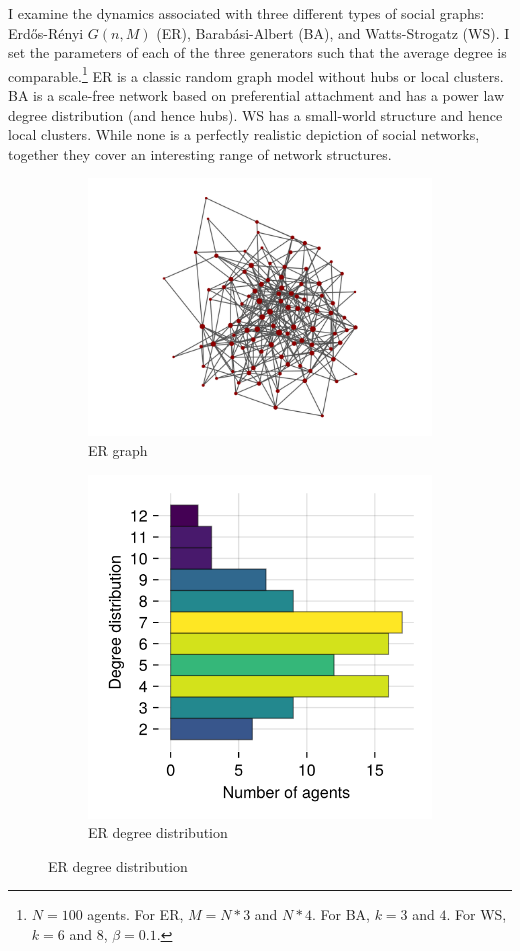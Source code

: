 \documentclass[]{article}
\begin{document}
I examine the dynamics associated with three different types of social graphs: Erdős-Rényi $G(n, M)$ (ER), Barabási-Albert (BA), and Watts-Strogatz (WS). I set the parameters of each of the three generators such that the average degree is comparable.\footnote{$N = 100$ agents. For ER, $M = N*3$ and $N*4$. For BA, $k = 3$ and $4$. For WS, $k = 6$ and $8$, $\beta = 0.1$.} ER is a classic random graph model without hubs or local clusters. BA is a scale-free network based on preferential attachment and has a power law degree distribution (and hence hubs). WS has a small-world structure and hence local clusters. While none is a perfectly realistic depiction of social networks, together they cover an interesting range of network structures.

\begin{figure}
	\begin{subfigure}{0.45\textwidth}
		\centering
		\includegraphics[width=0.9\linewidth]{../plots/g_erdosrenyi_n100_p3_s33} 
		\caption{ER graph}  \label{fig:subim11}
	\end{subfigure}
	\hfill
	\begin{subfigure}{0.45\textwidth}
		\centering
		\includegraphics[width=0.6\linewidth]{../plots/g_erdosrenyi_hist_degree_n100_p3_s33}
		\caption{ER degree distribution} \label{fig:subim12}
	\end{subfigure}
	

\end{figure}
\end{document}
